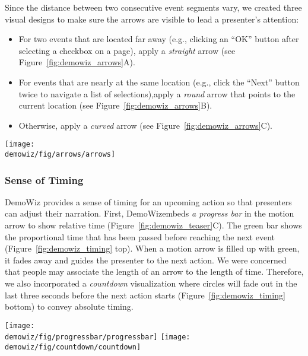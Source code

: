 Since the distance between two consecutive event segments vary, we created three visual designs to make sure the arrows are visible to lead a presenter's attention:

\begin{itemize}
  \item For two events that are located far away (e.g., clicking an ``OK'' button after selecting a checkbox on a page), apply a \textit{straight} arrow (see Figure~\ref{fig:demowiz_arrows}A).
  \item For events that are nearly at the same location (e.g., click the ``Next'' button twice to navigate a list of selections),apply a \textit{round} arrow that points to the current location (see Figure~\ref{fig:demowiz_arrows}B).
  \item Otherwise, apply a \textit{curved} arrow (see Figure~\ref{fig:demowiz_arrows}C).
\end{itemize}

\begin{figure*}[t]
  \centering
  \texttt{[image: \\demowiz/fig/arrows/arrows]}
  \caption{Three types of motion arrows in DemoWiz that guide presenters to the next event of different distances at a (A) far, (B) nearly the same, and (C) near location.}
  \label{fig:demowiz_arrows}
\end{figure*}


\subsubsection{Sense of Timing}
DemoWiz provides a sense of timing for an upcoming action so that presenters can adjust their narration. First, DemoWizembeds \textit{a progress bar} in the motion arrow to show relative time (Figure~\ref{fig:demowiz_teaser}C). The green bar shows the proportional time that has been passed before reaching the next event (Figure~\ref{fig:demowiz_timing} top). When a motion arrow is filled up with green, it fades away and guides the presenter to the next action. We were concerned that people may associate the length of an arrow to the length of time. Therefore, we also incorporated a \textit{countdown} visualization where circles will fade out in the last three seconds before the next action starts (Figure~\ref{fig:demowiz_timing} bottom) to convey absolute timing.

\begin{figure*}[t]
  \centering
  \texttt{[image: \\demowiz/fig/progressbar/progressbar]}
  \texttt{[image: \\demowiz/fig/countdown/countdown]}
  \caption{A progress in time guides the presenter from the current event (left) gradually to the upcoming action (right) using relative timing with a progress bar (top) and absolute timing (bottom).}
  \label{fig:demowiz_timing}
\end{figure*}

